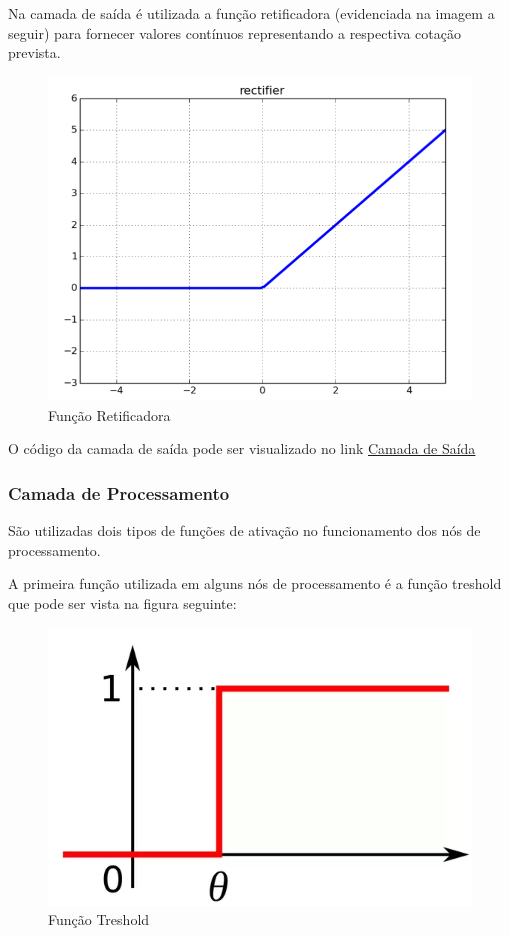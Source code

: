 Na camada de saída é utilizada a função retificadora (evidenciada na imagem a seguir) para fornecer valores contínuos representando a respectiva cotação prevista.
\pagebreak
\begin{figure}[h]
	\centering
	\includegraphics[keepaspectratio=true,scale=0.5]{figuras/ret.png}
	\caption{Função Retificadora \cite{data}}
	\label{fig14}
\end{figure}

O código da camada de saída pode ser visualizado no link  \href{https://github.com/matmello/brainbot/tree/master/output}{Camada de Saída}


\subsubsection[Camada de Processamento]{Camada de Processamento}


São utilizadas dois tipos de funções de ativação no funcionamento dos nós de processamento.

A primeira função utilizada em alguns nós de processamento é a função treshold que pode ser vista na figura seguinte:

\pagebreak

\begin{figure}[h]
	\centering
	\includegraphics[keepaspectratio=true,scale=0.6]{figuras/tresh.png}
	\caption{Função Treshold \cite{data}}
	\label{fig13}
\end{figure}

